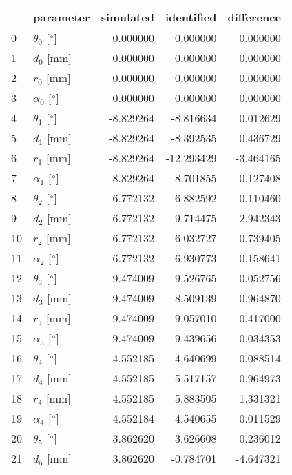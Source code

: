 \documentclass{standalone}%
\begin{document}
%
\normalsize%
\begin{tabular}{llrrr}
\toprule
{} &                 parameter & simulated & identified & difference \\
\midrule
0  &  $\theta_{0}$ [$\degree$] &  0.000000 &   0.000000 &   0.000000 \\
1  &              $d_{0}$ [mm] &  0.000000 &   0.000000 &   0.000000 \\
2  &              $r_{0}$ [mm] &  0.000000 &   0.000000 &   0.000000 \\
3  &  $\alpha_{0}$ [$\degree$] &  0.000000 &   0.000000 &   0.000000 \\
4  &  $\theta_{1}$ [$\degree$] & -8.829264 &  -8.816634 &   0.012629 \\
5  &              $d_{1}$ [mm] & -8.829264 &  -8.392535 &   0.436729 \\
6  &              $r_{1}$ [mm] & -8.829264 & -12.293429 &  -3.464165 \\
7  &  $\alpha_{1}$ [$\degree$] & -8.829264 &  -8.701855 &   0.127408 \\
8  &  $\theta_{2}$ [$\degree$] & -6.772132 &  -6.882592 &  -0.110460 \\
9  &              $d_{2}$ [mm] & -6.772132 &  -9.714475 &  -2.942343 \\
10 &              $r_{2}$ [mm] & -6.772132 &  -6.032727 &   0.739405 \\
11 &  $\alpha_{2}$ [$\degree$] & -6.772132 &  -6.930773 &  -0.158641 \\
12 &  $\theta_{3}$ [$\degree$] &  9.474009 &   9.526765 &   0.052756 \\
13 &              $d_{3}$ [mm] &  9.474009 &   8.509139 &  -0.964870 \\
14 &              $r_{3}$ [mm] &  9.474009 &   9.057010 &  -0.417000 \\
15 &  $\alpha_{3}$ [$\degree$] &  9.474009 &   9.439656 &  -0.034353 \\
16 &  $\theta_{4}$ [$\degree$] &  4.552185 &   4.640699 &   0.088514 \\
17 &              $d_{4}$ [mm] &  4.552185 &   5.517157 &   0.964973 \\
18 &              $r_{4}$ [mm] &  4.552185 &   5.883505 &   1.331321 \\
19 &  $\alpha_{4}$ [$\degree$] &  4.552184 &   4.540655 &  -0.011529 \\
20 &  $\theta_{5}$ [$\degree$] &  3.862620 &   3.626608 &  -0.236012 \\
21 &              $d_{5}$ [mm] &  3.862620 &  -0.784701 &  -4.647321 \\

\end{tabular}
\end{document}
